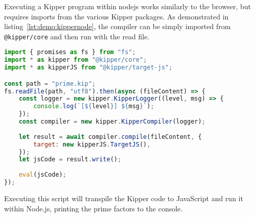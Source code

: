 Executing a Kipper program within \Gls{nodejs} works similarly to the browser, but requires imports from the various Kipper packages. As demonstrated in listing~\ref{lst:demo:kippernode}, the compiler can be simply imported from \lstinline|@kipper/core| and then run with the read file.

\begin{lstlisting}[language=JavaScript,caption=Executing Kipper code in Node.js, label=lst:demo:kippernode]
import { promises as fs } from "fs";
import * as kipper from "@kipper/core";
import * as kipperJS from "@kipper/target-js";

const path = "prime.kip";
fs.readFile(path, "utf8").then(async (fileContent) => {
	const logger = new kipper.KipperLogger((level, msg) => {
		console.log(`[${level}] ${msg}`);
	});
	const compiler = new kipper.KipperCompiler(logger);
	
	let result = await compiler.compile(fileContent, {
		target: new kipperJS.TargetJS(),
	});
	let jsCode = result.write();
	
	eval(jsCode);
});
\end{lstlisting}

Executing this script will transpile the Kipper code to JavaScript and run it within Node.js, printing the prime factors to the console.
